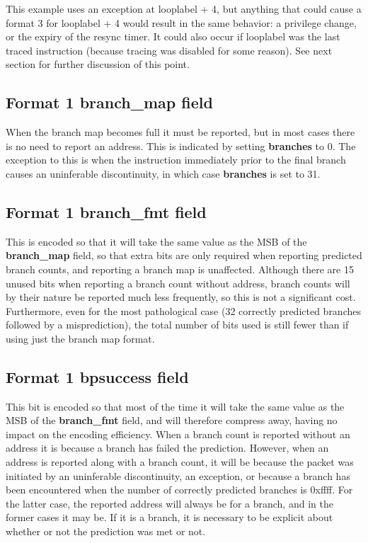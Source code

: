 This example uses an exception at looplabel + 4, but anything that could cause a format 3 for looplabel + 4 would result in 
the same behavior: a privilege change, or the expiry of the resync timer.  It could also occur if looplabel was the last
traced instruction (because tracing was disabled for some reason).  See next section for further discussion of this point.

\subsection{Format 1 \textbf{branch\_map} field}
When the branch map becomes full it must be reported, but in most cases there is no need to report an address.
This is indicated by setting \textbf{branches} to 0.  The exception to this is when the instruction immediately prior to 
the final branch causes an uninferable discontinuity, in which case \textbf{branches} is set to 31.

\subsection{Format 1 \textbf{branch\_fmt} field}

This is encoded so that it will take the same value as the MSB of the \textbf{branch\_map} field, so that extra bits are
only required when reporting predicted branch counts, and reporting a branch map is unaffected.  Although there are 15
unused bits when reporting a branch count without address, branch counts will by their nature be reported much less 
frequently, so this is not a significant cost.  Furthermore, even for the most pathological case (32 correctly predicted 
branches followed by a misprediction), the total number of bits used is still fewer than if using just the branch map
format.

\subsection{Format 1 \textbf{bpsuccess} field}
This bit is encoded so that most of the time it will take the same value as the MSB of the \textbf{branch\_fmt} field,
and will therefore compress away, having no impact on the encoding efficiency.  When a branch count is reported without 
an address it is because a branch has failed the prediction.  However, when an address is reported along with
a branch count, it will be because the packet was initiated by an uninferable discontinuity, an exception, or because a
branch has been encountered when the number of correctly predicted branches is 0xffff.  For the latter case, the 
reported address will always be for a branch, and in the former cases it may be.  If it is a branch, it is necessary to 
be explicit about whether or not the prediction was met or not.

